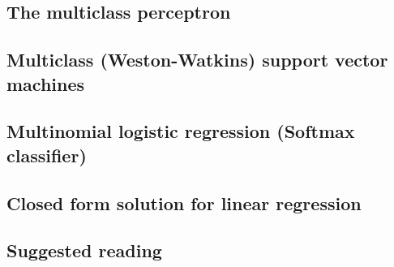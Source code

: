 \subsection{The multiclass perceptron}

\subsection{Multiclass (Weston-Watkins) support vector machines}

\subsection{Multinomial logistic regression (Softmax classifier)}

\subsection{Closed form solution for linear regression}


\subsection{Suggested reading}


